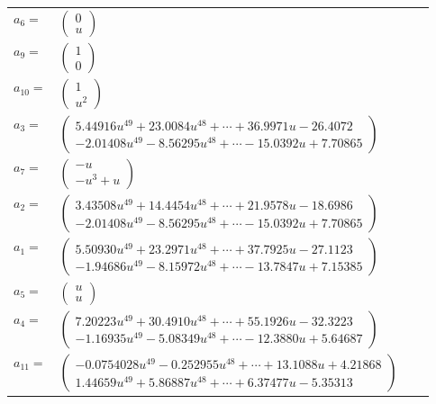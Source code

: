\documentclass[1p]{elsarticle_modified}
\theoremstyle{definition}
\begin{document}
\begin{tabular}{m{7pt} m{180pt} m{7pt} m{180pt} }
\flushright $a_{6}=$&$\begin{pmatrix}0\\u\end{pmatrix}$ \\
\flushright $a_{9}=$&$\begin{pmatrix}1\\0\end{pmatrix}$ \\
\flushright $a_{10}=$&$\begin{pmatrix}1\\u^2\end{pmatrix}$ \\
\flushright $a_{3}=$&$\begin{pmatrix}5.44916 u^{49}+23.0084 u^{48}+\cdots+36.9971 u-26.4072\\-2.01408 u^{49}-8.56295 u^{48}+\cdots-15.0392 u+7.70865\end{pmatrix}$ \\
\flushright $a_{7}=$&$\begin{pmatrix}- u\\- u^3+u\end{pmatrix}$ \\
\flushright $a_{2}=$&$\begin{pmatrix}3.43508 u^{49}+14.4454 u^{48}+\cdots+21.9578 u-18.6986\\-2.01408 u^{49}-8.56295 u^{48}+\cdots-15.0392 u+7.70865\end{pmatrix}$ \\
\flushright $a_{1}=$&$\begin{pmatrix}5.50930 u^{49}+23.2971 u^{48}+\cdots+37.7925 u-27.1123\\-1.94686 u^{49}-8.15972 u^{48}+\cdots-13.7847 u+7.15385\end{pmatrix}$ \\
\flushright $a_{5}=$&$\begin{pmatrix}u\\u\end{pmatrix}$ \\
\flushright $a_{4}=$&$\begin{pmatrix}7.20223 u^{49}+30.4910 u^{48}+\cdots+55.1926 u-32.3223\\-1.16935 u^{49}-5.08349 u^{48}+\cdots-12.3880 u+5.64687\end{pmatrix}$ \\
\flushright $a_{11}=$&$\begin{pmatrix}-0.0754028 u^{49}-0.252955 u^{48}+\cdots+13.1088 u+4.21868\\1.44659 u^{49}+5.86887 u^{48}+\cdots+6.37477 u-5.35313\end{pmatrix}$ \\

\end{tabular}
\end{document}
